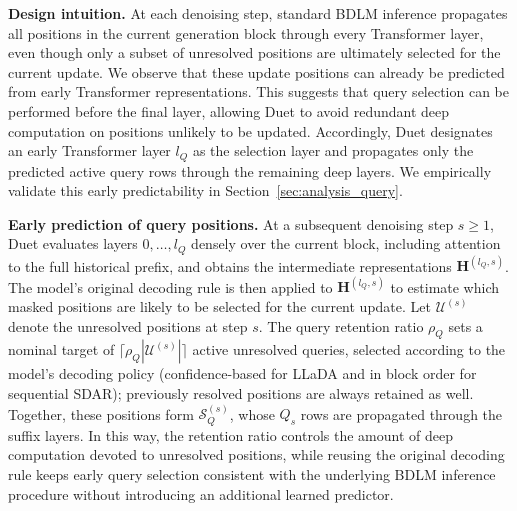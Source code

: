 \textbf{Design intuition.} At each denoising step, standard BDLM inference propagates all positions in the current generation block through every Transformer layer, even though only a subset of unresolved positions are ultimately selected for the current update. We observe that these update positions can already be predicted from early Transformer representations. This suggests that query selection can be performed before the final layer, allowing Duet to avoid redundant deep computation on positions unlikely to be updated. Accordingly, Duet designates an early Transformer layer $l_Q$ as the selection layer and propagates only the predicted active query rows through the remaining deep layers. We empirically validate this early predictability in Section~\ref{sec:analysis_query}.


\textbf{Early prediction of query positions.} At a subsequent denoising step $s\geq1$, Duet evaluates layers $0,\ldots,l_Q$ densely over the current block, including attention to the full historical prefix, and obtains the intermediate representations $\mathbf{H}^{(l_Q,s)}$. The model's original decoding rule is then applied to $\mathbf{H}^{(l_Q,s)}$ to estimate which masked positions are likely to be selected for the current update. Let $\mathcal{U}^{(s)}$ denote the unresolved positions at step $s$. The query retention ratio $\rho_Q$ sets a nominal target of
$\lceil \rho_Q |\mathcal{U}^{(s)}| \rceil$ active unresolved queries,
selected according to the model's decoding policy (confidence-based for
LLaDA and in block order for sequential SDAR); previously resolved
positions are always retained as well. Together, these positions form $\mathcal{S}_Q^{(s)}$, whose $Q_s$ rows are propagated through the suffix layers. In this way, the retention ratio controls the amount of deep computation devoted to unresolved positions, while reusing the original decoding rule keeps early query selection consistent with the underlying BDLM inference procedure without introducing an additional learned predictor.


